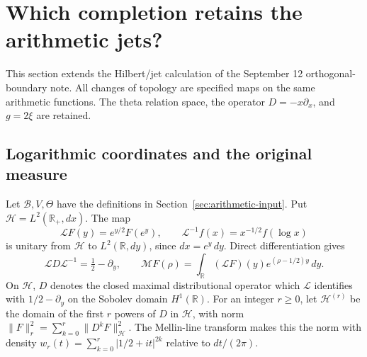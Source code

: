 \section{Which completion retains the arithmetic jets?}
\label{sec:jet-topology}
This section extends the Hilbert/jet calculation of the September 12
orthogonal-boundary note. All changes of topology are specified maps
on the same arithmetic functions. The theta relation space, the operator
\(D=-x\partial_x\), and \(g=2\xi\) are retained.

\subsection{Logarithmic coordinates and the original measure}
Let \(\mathscr B,V,\Theta\) have the definitions in
Section~\ref{sec:arithmetic-input}. Put \(\mathscr H=L^2(\mathbb R_+,dx)\).
The map
\[
 \mathcal LF(y)=e^{y/2}F(e^y),\qquad
 \mathcal L^{-1}f(x)=x^{-1/2}f(\log x)
\]
is unitary from \(\mathscr H\) to \(L^2(\mathbb R,dy)\), since
\(dx=e^y\,dy\). Direct differentiation gives
\[
 \mathcal L D\mathcal L^{-1}=\tfrac12-\partial_y,\qquad
 \mathcal MF(\rho)=\int_{\mathbb R}(\mathcal LF)(y)e^{(\rho-1/2)y}\,dy .
 \tag{JT1}
\]
On \(\mathscr H\), \(D\) denotes the closed maximal distributional
operator which \(\mathcal L\) identifies with
\(1/2-\partial_y\) on the Sobolev domain \(H^1(\mathbb R)\).
For an integer \(r\geq0\), let \(\mathscr H^{(r)}\) be the domain of
the first \(r\) powers of \(D\) in \(\mathscr H\), with norm
\(\|F\|_r^2=\sum_{k=0}^r\|D^kF\|_{\mathscr H}^2\).
The Mellin-line transform makes this the norm with density
\(w_r(t)=\sum_{k=0}^r|1/2+it|^{2k}\) relative to \(dt/(2\pi)\).

